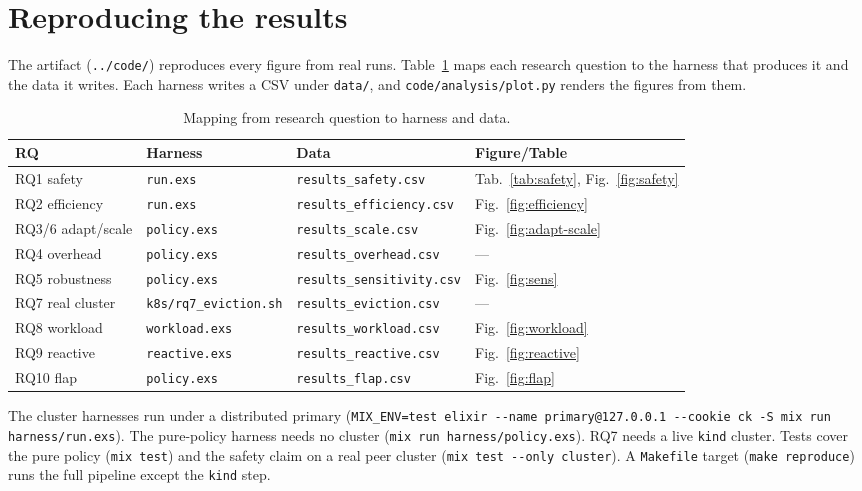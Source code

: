 \documentclass[AMA,Times1COL]{WileyNJDv5}
\begin{document}


\appendix
\section{Reproducing the results}\label{app:repro}
The artifact (\texttt{../code/}) reproduces every figure from real runs. Table~\ref{tab:repro} maps each
research question to the harness that produces it and the data it writes. Each harness writes a CSV under
\texttt{data/}, and \texttt{code/analysis/plot.py} renders the figures from them.

\begin{table}[h]
\centering
\caption{Mapping from research question to harness and data.}\label{tab:repro}
\begin{tabular}{@{}llll@{}}
\toprule
\textbf{RQ} & \textbf{Harness} & \textbf{Data} & \textbf{Figure/Table} \\
\midrule
RQ1 safety        & \texttt{run.exs}      & \texttt{results\_safety.csv}      & Tab.~\ref{tab:safety}, Fig.~\ref{fig:safety} \\
RQ2 efficiency    & \texttt{run.exs}      & \texttt{results\_efficiency.csv}  & Fig.~\ref{fig:efficiency} \\
RQ3/6 adapt/scale & \texttt{policy.exs}   & \texttt{results\_scale.csv}       & Fig.~\ref{fig:adapt-scale} \\
RQ4 overhead      & \texttt{policy.exs}   & \texttt{results\_overhead.csv}    & --- \\
RQ5 robustness    & \texttt{policy.exs}   & \texttt{results\_sensitivity.csv} & Fig.~\ref{fig:sens} \\
RQ7 real cluster  & \texttt{k8s/rq7\_eviction.sh} & \texttt{results\_eviction.csv} & --- \\
RQ8 workload      & \texttt{workload.exs} & \texttt{results\_workload.csv}    & Fig.~\ref{fig:workload} \\
RQ9 reactive      & \texttt{reactive.exs} & \texttt{results\_reactive.csv}    & Fig.~\ref{fig:reactive} \\
RQ10 flap         & \texttt{policy.exs}   & \texttt{results\_flap.csv}        & Fig.~\ref{fig:flap} \\
\bottomrule
\end{tabular}
\end{table}

\noindent The cluster harnesses run under a distributed primary
(\texttt{MIX\_ENV=test elixir -{}-name primary@127.0.0.1 -{}-cookie ck -S mix run harness/run.exs}). The
pure-policy harness needs no cluster (\texttt{mix run harness/policy.exs}). RQ7 needs a live \texttt{kind}
cluster. Tests cover the pure policy (\texttt{mix test}) and the safety claim on a real peer cluster
(\texttt{mix test -{}-only cluster}). A \texttt{Makefile} target (\texttt{make reproduce}) runs the full
pipeline except the \texttt{kind} step.
\end{document}
